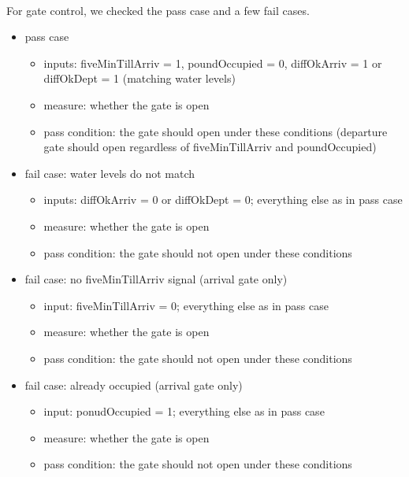 \documentclass{article}
\begin{document}
      \paragraph{} For gate control, we checked the pass case and a few fail cases.
      \begin{itemize}
        \item pass case
        \begin{itemize}
          \item inputs: fiveMinTillArriv = 1, poundOccupied = 0, diffOkArriv = 1 or diffOkDept = 1 (matching water levels)
          \item measure: whether the gate is open
          \item pass condition: the gate should open under these conditions (departure gate should open regardless of fiveMinTillArriv and poundOccupied)
        \end{itemize}

        \item fail case: water levels do not match
        \begin{itemize}
          \item inputs: diffOkArriv = 0 or diffOkDept = 0; everything else as in pass case
          \item measure: whether the gate is open
          \item pass condition: the gate should not open under these conditions
        \end{itemize}

        \item fail case: no fiveMinTillArriv signal (arrival gate only)
        \begin{itemize}
          \item input: fiveMinTillArriv = 0; everything else as in pass case
          \item measure: whether the gate is open
          \item pass condition: the gate should not open under these conditions
        \end{itemize}

        \item fail case: already occupied (arrival gate only)
        \begin{itemize}
          \item input: ponudOccupied = 1; everything else as in pass case
          \item measure: whether the gate is open
          \item pass condition: the gate should not open under these conditions
        \end{itemize}
      \end{itemize}
\end{document}
